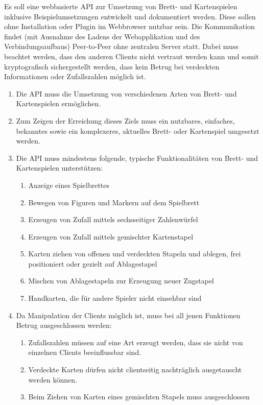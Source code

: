 Es soll eine webbasierte API zur Umsetzung von Brett- und Kartenspielen
inklusive Beispielumsetzungen entwickelt und dokumentiert werden. Diese sollen
ohne Installation oder Plugin im Webbrowser nutzbar sein. Die Kommunikation
findet (mit Ausnahme des Ladens der Webapplikation und des Verbindungsaufbaus)
Peer-to-Peer ohne zentralen Server statt. Dabei muss beachtet werden, dass den
anderen Clients nicht vertraut werden kann und somit kryptografisch
sichergestellt werden, dass kein Betrug bei verdeckten Informationen oder
Zufallszahlen möglich ist.

\begin{enumerate}
  \item Die API muss die Umsetzung von verschiedenen Arten von Brett- und
  Kartenspielen ermöglichen.
  \item Zum Zeigen der Erreichung dieses Ziels muss ein nutzbares, einfaches,
  bekanntes sowie ein komplexeres, aktuelles  Brett- oder Kartenspiel umgesetzt
  werden.
  \item Die API muss mindestens folgende, typische Funktionalitäten von Brett-
  und Kartenspielen unterstützen:
  \begin{enumerate}
    \item Anzeige eines Spielbrettes
    \item Bewegen von Figuren und Markern auf dem Spielbrett
    \item Erzeugen von Zufall mittels sechsseitiger Zahlenwürfel
    \item Erzeugen von Zufall mittels gemischter Kartenstapel
    \item Karten ziehen von offenen und verdeckten Stapeln und ablegen, frei
    positioniert oder gezielt auf Ablagestapel
    \item Mischen von Ablagestapeln zur Erzeugung neuer Zugstapel
    \item Handkarten, die für andere Spieler nicht einsehbar sind
  \end{enumerate}
  \item Da Manipulation der Clients möglich ist, muss bei all jenen
  Funktionen Betrug ausgeschlossen werden:
  \begin{enumerate}
    \item Zufallszahlen müssen auf eine Art erzeugt werden, dass sie nicht von
    einzelnen Clients beeinflussbar sind.
    \item Verdeckte Karten dürfen nicht clientseitig nachträglich ausgetauscht
    werden können.
    \item Beim Ziehen von Karten eines gemischten Stapels muss ausgeschlossen

\end{enumerate}
\end{enumerate}

